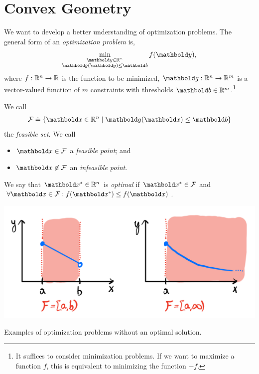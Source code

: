 
\chapter{Convex Geometry}

We want to develop a better understanding of optimization problems. The general form of an \emph{optimization problem} is, \begin{align}
    \min_{\substack{\vy \in \R^n \\ \vg(\vy) \leq \vb}} f(\vy), \label{eq:optimization_problem}
\end{align} where $f : \mathbb{R}^n \to \mathbb{R}$ is the function to be minimized, $\vg : \R^n \to \R^m$ is a vector-valued function of $m$ constraints with thresholds $\vb \in \R^m$.\footnote{It suffices to consider minimization problems. If we want to maximize a function $f$, this is equivalent to minimizing the function $-f$.}

\begin{defn} We call \begin{align}
    \spa{F} \defeq \{\vx \in \R^n \mid \vg(\vx) \leq \vb\}
\end{align} the \emph{feasible set}. We call \begin{itemize}
    \item $\vx \in \spa{F}$ a \emph{feasible point}; and
    \item $\vx \not\in \spa{F}$ an \emph{infeasible point}.
\end{itemize}
\end{defn}
\begin{defn} We say that $\s{\vx} \in \R^n$ is \emph{optimal} if $\s{\vx} \in \spa{F}$ and $\forall \vx \in \spa{F}: f(\s{\vx}) \leq f(\vx)$.
\end{defn}
\begin{marginfigure}
\includegraphics[width=\textwidth]{notes/figures/no_opt.png}
\caption{Examples of optimization problems without an optimal solution.}
\end{marginfigure}

